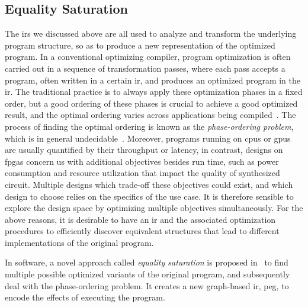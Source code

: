 \subsection{Equality Saturation}
\label{bg:sub:equality_saturation}

The \glspl{ir} we discussed above are all used to analyze and transform the
underlying program structure, so as to produce a new representation of the
optimized program.  In a conventional optimizing compiler, program optimization
is often carried out in a sequence of transformation passes, where each pass
accepts a program, often written in a certain \gls{ir}, and produces an
optimized program in the \gls{ir}\@.  The traditional practice is to always
apply these optimization phases in a fixed order, but a good ordering of these
phases is crucial to achieve a good optimized result, and the optimal ordering
varies across applications being compiled~\cite{almagor04}.  The process of
finding the optimal ordering is known as the \emph{phase-ordering problem},
which is in general undecidable~\cite{touati06}.  Moreover, programs running
on \glspl{cpu} or \glspl{gpu} are usually quantified by their throughput or
latency, in contrast, designs on \glspl{fpga} concern us with additional
objectives besides run time, such as power consumption and resource utilization
that impact the quality of synthesized circuit.  Multiple designs which
trade-off these objectives could exist, and which design to choose relies
on the specifics of the use case.  It is therefore sensible to explore the
design space by optimizing multiple objectives simultaneously.  For the above
reasons, it is desirable to have an \gls{ir} and the associated optimization
procedures to efficiently discover equivalent structures that lead to different
implementations of the original program.

In software, a novel approach called \emph{equality saturation} is proposed
in~\cite{tate09} to find multiple possible optimized variants of the original
program, and subsequently deal with the phase-ordering problem.  It creates a
new graph-based \gls{ir}, \gls{peg}, to encode the effects of executing the
program.

